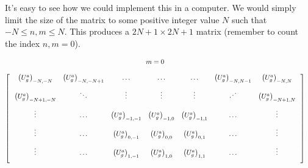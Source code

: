 \documentclass{article}
\begin{document}
It's easy to see how we could implement this in a computer. We would simply limit the size of the matrix to some positive integer value $N$ such that $-N \leq n,m \leq N$. This produces a $2N+1 \times 2N+1$ matrix (remember to count the index $n,m=0$).


\small
\[%
    \begin{matrix}
        m=0 &  \vspace{0.4cm}\\
        \begin{bmatrix} 
            \hspace{0.25cm} \left(U^{a}_{g}\right)_{-N,-N}   & \left(U^{a}_{g}\right)_{-N,-N+1} & \ldots                         & \ldots                        & \ldots & \left(U^{a}_{g}\right)_{-N,N-1} & \left(U^{a}_{g}\right)_{-N,N}     \hspace{0.25cm} \vspace{0.25cm} \\
            \hspace{0.25cm} \left(U^{a}_{g}\right)_{-N+1,-N} & \ddots                           & \vdots                         & \vdots                        & \vdots                          & \iddots                         & \left(U^{a}_{g}\right)_{-N+1,N}     \hspace{0.25cm} \vspace{0.25cm} \\
            \hspace{0.25cm} \vdots                           & \ldots                           & \left(U^{a}_{g}\right)_{-1,-1} & \left(U^{a}_{g}\right)_{-1,0} & \left(U^{a}_{g}\right)_{-1,1}   & \ldots                          & \vdots    \hspace{0.25cm} \vspace{0.25cm} \\
            \hspace{0.25cm} \vdots                           & \ldots                           & \left(U^{a}_{g}\right)_{0,-1}  & \left(U^{a}_{g}\right)_{0,0}  & \left(U^{a}_{g}\right)_{0,1}    & \ldots                          & \vdots                            \hspace{0.25cm} \vspace{0.25cm} \\
            \hspace{0.25cm} \vdots                           & \ldots                           & \left(U^{a}_{g}\right)_{1,-1}  & \left(U^{a}_{g}\right)_{1,0}  & \left(U^{a}_{g}\right)_{1,1}    & \ldots                          & \vdots     \hspace{0.25cm} \vspace{0.25cm} \\

\end{bmatrix}
\end{matrix}\]
\end{document}
